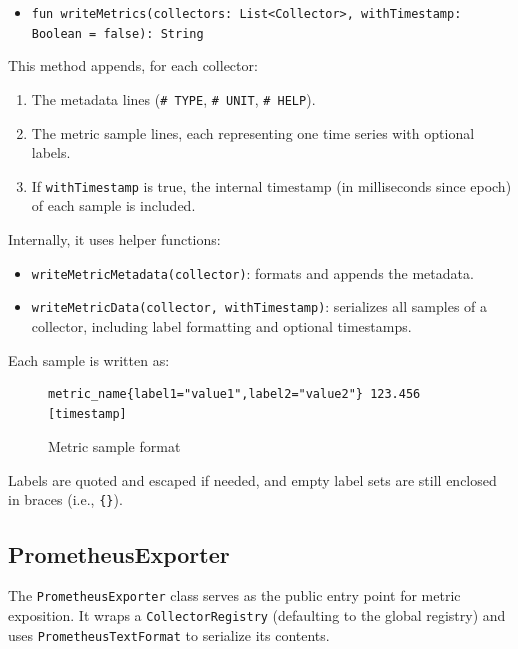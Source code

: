 \begin{itemize}
    \item \texttt{fun writeMetrics(collectors: List<Collector>, withTimestamp: Boolean = false): String}
\end{itemize}

This method appends, for each collector:

\begin{enumerate}
    \item The metadata lines (\texttt{\# TYPE}, \texttt{\# UNIT}, \texttt{\# HELP}).
    \item The metric sample lines, each representing one time series with optional labels.
    \item If \texttt{withTimestamp} is true, the internal timestamp (in milliseconds since epoch) of each sample is included.
\end{enumerate}

Internally, it uses helper functions:

\begin{itemize}
    \item \texttt{writeMetricMetadata(collector)}: formats and appends the metadata.
    \item \texttt{writeMetricData(collector, withTimestamp)}: serializes all samples of a collector, including label formatting and optional timestamps.
\end{itemize}

Each sample is written as:

\begin{figure}[h]
    \begin{lstlisting}
metric_name{label1="value1",label2="value2"} 123.456 [timestamp]
    \end{lstlisting}
    \caption{Metric sample format}
\end{figure}

Labels are quoted and escaped if needed, and empty label sets are still enclosed in braces (i.e., \texttt{\{\}}).

\subsection{PrometheusExporter}\label{subsec:prometheusexporter}

The \texttt{PrometheusExporter} class serves as the public entry point for metric exposition.
It wraps a \texttt{CollectorRegistry} (defaulting to the global registry) and uses \texttt{PrometheusTextFormat} to serialize its contents.

